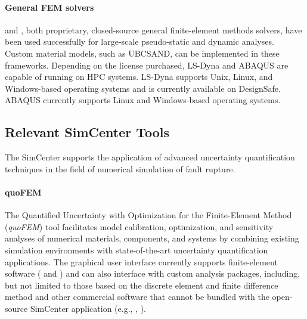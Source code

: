 \paragraph{General FEM solvers}
 and , both proprietary, closed-source general finite-element methods solvers, have been used successfully for large-scale pseudo-static and dynamic analyses. Custom material models, such as UBCSAND, can be implemented in these frameworks. Depending on the license purchased, LS-Dyna and ABAQUS are capable of running on HPC systems. LS-Dyna supports Unix, Linux, and Windows-based operating systems and is currently available on DesignSafe. ABAQUS currently supports Linux and Windows-based operating systems.

\subsection{Relevant SimCenter Tools}

The SimCenter supports the application of advanced uncertainty quantification techniques in the field of numerical simulation of fault rupture.

\paragraph{quoFEM} The Quantified Uncertainty with Optimization for the Finite-Element Method (\emph{quoFEM}) tool facilitates model calibration, optimization, and sensitivity analyses of numerical materials, components, and systems by combining existing simulation environments with state-of-the-art uncertainty quantification applications. The graphical user interface currently supports finite-element software ( and ) and can also interface with custom analysis packages, including, but not limited to those based on the discrete element and finite difference method and other commercial software that cannot be bundled with the open-source SimCenter application (e.g., , ). 



